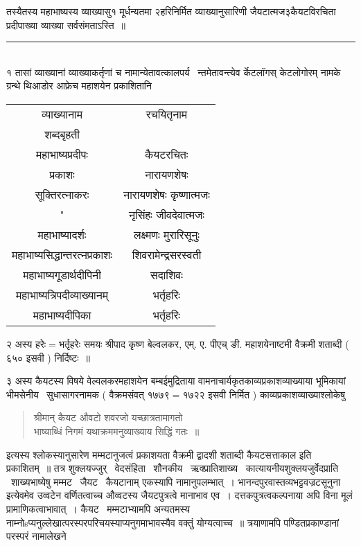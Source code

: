 \documentclass[11pt, openany]{book}
\begin{document}
\begin{multicols}{2}
तस्यैतस्य महाभाष्यस्य व्याख्यासु१ मूर्धन्यतमा २हरिनिर्मित व्याख्यानुसारिणी जैयटात्मज३कैयटविरचिता प्रदीपाख्या व्याख्या सर्वसंमताऽस्ति~॥

\noindent
\rule{1\linewidth}{0.5pt}\\

१ तासां व्याख्यानां व्याख्याकर्तृणां च नामान्येतावत्कालपर्य \textendash\ न्तमेतावन्त्येव र्केटलॉगस् केटलोगोरम् नामके ग्रन्थे थिआडोर आफ्रेच महाशयेन प्रकाशितानि

\begin{tabular}{c c}
व्याख्यानाम& रचयितृनाम \\
शब्दबृहती & \\
महाभाष्यप्रदीपः& कैयटरचितः \\
प्रकाशः& नारायणशेषः \\
सूक्तिरत्नाकरः & नारायणशेषः कृष्णात्मजः \\
" & नृसिंहः जीवदेवात्मजः \\
महाभाष्यादर्शः & लक्ष्मणः मुरारिसूनुः \\
महाभाष्यसिद्धान्तरत्नप्रकाशः & शिवरामेन्द्रसरस्वती \\
महाभाष्यगूडार्थदीपिनी & सदाशिवः \\
महाभाष्यत्रिपदीव्याख्यानम् & भर्तृहरिः\\
महाभाष्यदीपिका & भर्तृहरिः
\end{tabular}

२ अस्य हरेः$=$भर्तृहरेः समयः श्रीपाद कृष्ण बेल्वलकर, एम्. ए. पीएच् ङी. महाशयेनाष्टमी वैक्रमी शताब्दी ( ६५० इसवी ) निर्दिष्टः~॥

३ अस्य कैयटस्य विषये वेल्वलकरमहाशयेन बम्बईमुद्रिताया वामनाचार्यकृतकाव्यप्रकाशव्याख्याया भूमिकायां भीमसेनीय \textendash\ सुधासागरनामक ( वैक्रमसंवत् १७७९$=$१७२२ इसवी निर्मित ) काव्यप्रकाशव्याख्याश्लोकेषु \textendash\ 

\begin{quote}
{\qt श्रीमान् कैयट औवटो शवरजो यच्छात्रतामागतो\\
भाष्याब्धिं निगमं यथाक्रममनुव्याख्याय सिद्धिं गतः~॥}
\end{quote}

इत्यस्य श्लोकस्यानुसारेण मम्मटानुजत्वं प्रकाशयता वैक्रमी द्वादशी शताब्दी कैयटसत्ताकाल इति प्रकाशितम्~॥ तत्र शुक्लयज्जुर् \textendash\ वेदसंहिता \textendash\ शौनकीय \textendash\ ऋक्प्रातिशाख्य \textendash\ कात्यायनीयशुक्लयजुर्वेदप्राति \textendash\ शाख्यभाष्येषु मम्मट \textendash\ जैयट \textendash\ कैयटानाम् एकस्यापि नामानुपलम्भात्~। {\qt भानन्दपुरवास्तव्यभट्टवज्रटसूनुना} इत्येवमेव उव्वटेन वर्णितत्वाच्च औव्वटस्य जैयटपुत्रत्वे मानाभाव एव~। दत्तकपुत्रत्वकल्पनाया अपि विना मूलं प्रामाणिकत्वाभावात्~। कैयट \textendash\ मम्मटाभ्यामपि अन्यतमस्य नाम्नोsप्यनुल्लेखात्परस्परपरिचयस्याप्यनुगमाभावस्यैव वक्तुं योग्यत्वाच्च~॥ त्रयाणामपि पण्डितप्रकाण्डानां परस्परं नामालेखने


\end{multicols}
\end{document}
